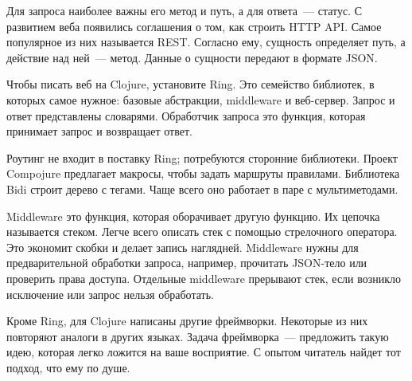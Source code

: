 Для запроса наиболее важны его метод и путь, а для ответа~--- статус. С
развитием веба появились соглашения о том, как строить HTTP API. Самое
популярное из них называется REST. Согласно ему, сущность определяет путь, а
действие над ней~--- метод. Данные о сущности передают в формате JSON.

Чтобы писать веб на Clojure, установите Ring. Это семейство библиотек,
в которых самое нужное: базовые абстракции, middleware и веб-сервер. Запрос и
ответ представлены словарями. Обработчик запроса это функция, которая принимает
запрос и возвращает ответ.

Роутинг не входит в поставку Ring; потребуются сторонние библиотеки. Проект
Compojure предлагает макросы, чтобы задать маршруты правилами. Библиотека Bidi
строит дерево с тегами. Чаще всего оно работает в паре с мультиметодами.

Middleware это функция, которая оборачивает другую функцию. Их цепочка
называется стеком. Легче всего описать стек с помощью стрелочного оператора. Это
экономит скобки и делает запись наглядней. Middleware нужны для предварительной
обработки запроса, например, прочитать JSON-тело или проверить права
доступа. Отдельные middleware прерывают стек, если возникло исключение или
запрос нельзя обработать.

Кроме Ring, для Clojure написаны другие фреймворки. Некоторые из них повторяют
аналоги в других языках. Задача фреймворка~--- предложить такую идею, которая
легко ложится на ваше восприятие. С опытом читатель найдет тот подход, что ему
по душе.
